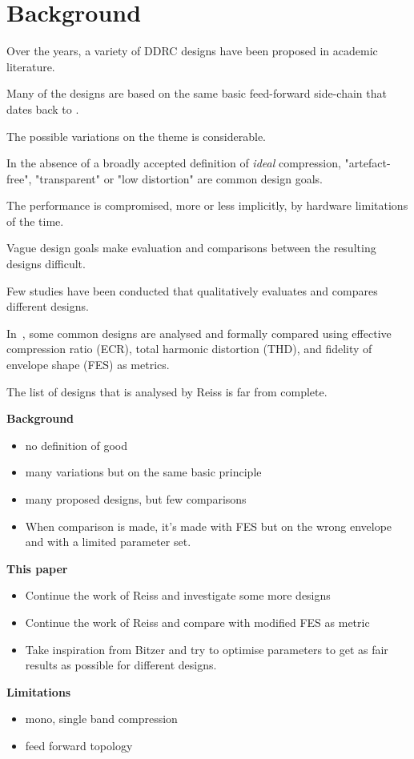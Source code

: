 \documentclass[../main2.tex]{subfiles}
\begin{document}
\FloatBarrier
\section{Background} \label{background}


Over the years, a variety of DDRC designs have been proposed in academic literature. 

Many of the designs are based on the same basic feed-forward side-chain that dates back to \cite{mcnally1984dynamic}.

The possible variations on the theme is considerable.

In the absence of a broadly accepted definition of \emph{ideal} compression, "artefact-free", "transparent" or "low distortion" are common design goals.

The performance is compromised, more or less implicitly, by hardware limitations of the time.

Vague design goals make evaluation and comparisons between the resulting designs difficult.

Few studies have been conducted that qualitatively evaluates and compares different designs. 


In~\cite{reiss2012tutorial}, some common designs are analysed and formally compared using effective compression ratio (ECR), total harmonic distortion (THD), and fidelity of envelope shape (FES) as metrics. 

The list of designs that is analysed by Reiss is far from complete.




\textbf{Background}
\begin{itemize}
\item no definition of good
\item many variations but on the same basic principle
\item many proposed designs, but few comparisons
\item When comparison is made, it's made with FES but on the wrong envelope and with a limited parameter set.
\end{itemize}
\textbf{This paper}
\begin{itemize}
\item Continue the work of Reiss and investigate some more designs
\item Continue the work of Reiss and compare with modified FES as metric
\item Take inspiration from Bitzer and try to optimise parameters to get as fair results as possible for different designs.
\end{itemize}
\textbf{Limitations}
\begin{itemize}
\item mono, single band compression
\item feed forward topology
\end{itemize}
\end{document}
